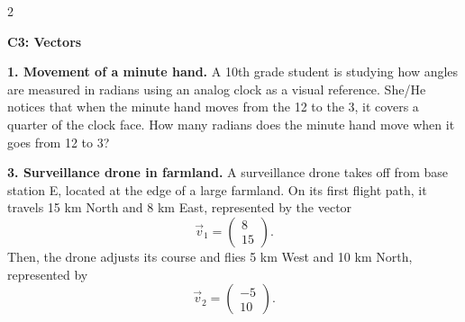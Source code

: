 \documentclass[12pt]{article}
\newcommand{\SubsectionBox}[1]{%
	\noindent\colorbox{gray!30}{%
		\parbox{\linewidth}{\textbf{#1}}%
	}\par\vspace{0.35cm}%
}
\begin{document}
	\vspace{0.8cm}
	
	\begin{multicols}{2}
		
		\SubsectionBox{C3: Vectors}
		
		\textbf{1. Movement of a minute hand.}
		A 10th grade student is studying how angles are measured in radians using an analog clock as a visual reference. She/He notices that when the minute hand moves from the 12 to the 3, it covers a quarter of the clock face. How many radians does the minute hand move when it goes from 12 to 3?
		
		\vspace{0.6cm}
		
		\textbf{3. Surveillance drone in farmland.}
		A surveillance drone takes off from base station E, located at the edge of a large farmland. On its first flight path, it travels 15 km North and 8 km East, represented by the vector
		\[
		\vec{v}_1=\begin{pmatrix}8\\15\end{pmatrix}.
		\]
		Then, the drone adjusts its course and flies 5 km West and 10 km North, represented by
		\[
		\vec{v}_2=\begin{pmatrix}-5\\10\end{pmatrix}.
		\]
		
	\end{multicols}
	
\end{document}
